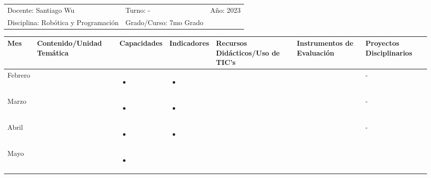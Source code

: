 \documentclass[landscape, a4paper, 10pt]{article}
\newcommand{\smallcellwidth}{0.7in}
\newcommand{\normalcellwidth}{1.2in}
\newcommand{\bigcellwidth}{2.0in}
\newcommand{\profesor}{Santiago Wu}
\newcommand{\discipline}{Robótica y Programación}
\newcommand{\currentyear}{2023}
\begin{document}
	\begin{tabularx}{\textwidth}{ >{\raggedright\arraybackslash}X >{\raggedright\arraybackslash}X >{\raggedright\arraybackslash}X }
		Docente: \profesor &
		Turno: - &
		Año: \currentyear \\
		Disciplina: \discipline &
		Grado/Curso: 7mo Grado &
		 \\
	\end{tabularx}
	\centering
	\begin{longtable}{|m{\smallcellwidth}|p{\normalcellwidth}|p{\bigcellwidth}|p{\bigcellwidth}|p{\normalcellwidth}|p{\normalcellwidth}|p{\normalcellwidth}|}
	
		\hline
		\textbf{Mes} &
		\textbf{Contenido/Unidad Temática} &
		\textbf{Capacidades} &
		\textbf{Indicadores} &
		\textbf{Recursos Didácticos/Uso de TIC's} &
		\textbf{Instrumentos de Evaluación} &
		\textbf{Proyectos Disciplinarios} \\
		\hline
		\endhead
		Febrero &
		 &
		\begin{itemize}
			\item 
		\end{itemize} &
		\begin{itemize}
			\item 
		\end{itemize} &
		  &
		  &
		 - \\
		\hline
		Marzo &
		 &
		\begin{itemize}
			\item 
		\end{itemize} &
		\begin{itemize}
			\item 
		\end{itemize} &
		  &
		  &
		 - \\
		\hline
		Abril &
		 &
		\begin{itemize}
			\item 
		\end{itemize} &
		\begin{itemize}
			\item 
		\end{itemize} &
		  &
		  &
		 - \\
		\hline
		Mayo &
		 &
		\begin{itemize}
			\item 
		\end{itemize} &

\end{longtable}
\end{document}

